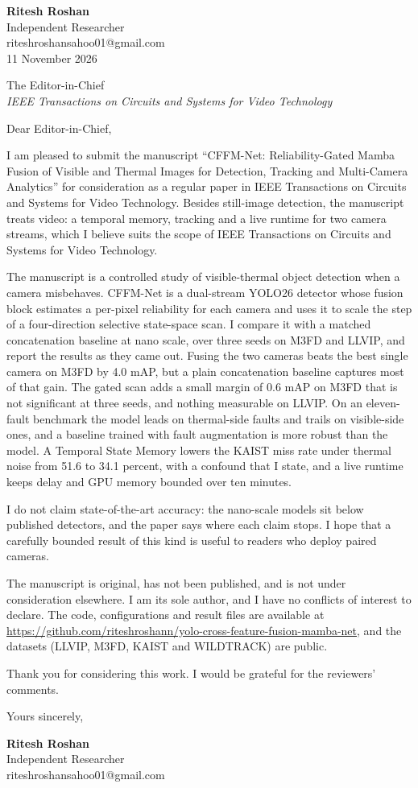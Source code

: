 \documentclass[11pt]{article}
\begin{document}
\raggedright
\textbf{Ritesh Roshan}\\
Independent Researcher\\
riteshroshansahoo01@gmail.com\\
11 November 2026

The Editor-in-Chief\\
\textit{IEEE Transactions on Circuits and Systems for Video Technology}

Dear Editor-in-Chief,

I am pleased to submit the manuscript ``CFFM-Net: Reliability-Gated Mamba Fusion of Visible and Thermal Images for Detection, Tracking and Multi-Camera Analytics'' for consideration as a regular paper in IEEE Transactions on Circuits and Systems for Video Technology. Besides still-image detection, the manuscript treats video: a temporal memory, tracking and a live runtime for two camera streams, which I believe suits the scope of IEEE Transactions on Circuits and Systems for Video Technology.

The manuscript is a controlled study of visible-thermal object detection when a camera misbehaves. CFFM-Net is a dual-stream YOLO26 detector whose fusion block estimates a per-pixel reliability for each camera and uses it to scale the step of a four-direction selective state-space scan. I compare it with a matched concatenation baseline at nano scale, over three seeds on M3FD and LLVIP, and report the results as they came out. Fusing the two cameras beats the best single camera on M3FD by 4.0 mAP, but a plain concatenation baseline captures most of that gain. The gated scan adds a small margin of 0.6 mAP on M3FD that is not significant at three seeds, and nothing measurable on LLVIP. On an eleven-fault benchmark the model leads on thermal-side faults and trails on visible-side ones, and a baseline trained with fault augmentation is more robust than the model. A Temporal State Memory lowers the KAIST miss rate under thermal noise from 51.6 to 34.1 percent, with a confound that I state, and a live runtime keeps delay and GPU memory bounded over ten minutes.

I do not claim state-of-the-art accuracy: the nano-scale models sit below published detectors, and the paper says where each claim stops. I hope that a carefully bounded result of this kind is useful to readers who deploy paired cameras.

The manuscript is original, has not been published, and is not under consideration elsewhere. I am its sole author, and I have no conflicts of interest to declare. The code, configurations and result files are available at \url{https://github.com/riteshroshann/yolo-cross-feature-fusion-mamba-net}, and the datasets (LLVIP, M3FD, KAIST and WILDTRACK) are public.

Thank you for considering this work. I would be grateful for the reviewers' comments.

Yours sincerely,

\vspace{0.4em}
\textbf{Ritesh Roshan}\\
Independent Researcher\\
riteshroshansahoo01@gmail.com
\end{document}
